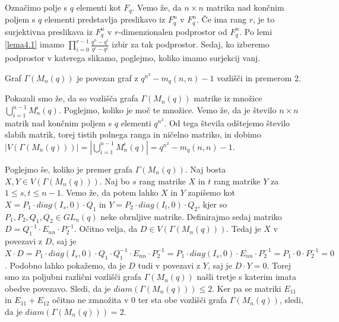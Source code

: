 \documentclass[mat1, tisk]{fmfdelo}
\begin{document}
\begin{dokaz}
  Označimo polje s $q$ elementi kot $F_q$.
  Vemo že, da $n \times n$ matrika nad končnim poljem s $q$ elementi predstavlja 
  preslikavo iz $F_q^n$ v $F_q^n$. Če ima rang $r$, je to surjektivna preslikava iz $F_q^n$ v 
  $r$-dimenzionalen podprostor od $F_q^n$. Po lemi \ref{lema4.1} imamo 
  $\prod\limits_{i=0}^{r-1} \frac{q^n - q^i}{q^r - q^i}$ izbir za tak podprostor. Sedaj, ko 
  izberemo podprostor v katerega slikamo, poglejmo, koliko imamo surjekcij vanj.
\end{dokaz}
%
\begin{lema}\label{lema4.3}
  Graf $\Gamma(M_n(q))$ je povezan graf z $q^{n^2} - m_q(n,n) - 1$ vozlišči in premerom $2$.
\end{lema}
\begin{dokaz}
  Pokazali smo že, da so vozlišča grafa $\Gamma(M_n(q))$ matrike iz množice $\bigcup\limits_{i=1}^{n-1} M_n^i(q)$. 
  Poglejmo, koliko je moč te množice. Vemo že, da je število $n \times n$ matrik nad končnim poljem s $q$ elementi 
  $q^{n^2}$. Od tega števila odštejemo število slabih matrik, torej tistih polnega ranga in ničelno matriko, 
  in dobimo $|V(\Gamma(M_n(q)))| = |\bigcup\limits_{i=1}^{n-1} M_n^i(q)| = q^{n^2} - m_q(n,n) - 1$.

  Poglejmo še, koliko je premer grafa $\Gamma(M_n(q))$. Naj bosta $X, Y \in V(\Gamma(M_n(q)))$. 
  Naj bo $s$ rang matrike $X$ in $t$ rang matrike $Y$ za $1 \leq s, t \leq n-1$. Vemo že, 
  da potem lahko $X$ in $Y$ zapišemo kot $X = P_1 \cdot diag(I_s, 0) \cdot Q_1$ in 
  $Y = P_2 \cdot diag(I_t, 0) \cdot Q_2$, kjer so $P_1, P_2, Q_1, Q_2 \in GL_n(q)$ 
  neke obrnljive matrike. Definirajmo sedaj matriko $D = Q^{-1}_1 \cdot E_{nn} \cdot P^{-1}_2$. 
  Očitno velja, da $D \in V(\Gamma(M_n(q)))$. Tedaj je $X$ v povezavi z $D$, saj je 
  $X \cdot D = P_1 \cdot diag(I_s, 0) \cdot Q_1 \cdot Q^{-1}_1 \cdot E_{nn} \cdot P^{-1}_2 = P_1 \cdot diag(I_s, 0) \cdot E_{nn} \cdot P^{-1}_2 = P_1 \cdot 0 \cdot P^{-1}_2 = 0$. 
  Podobno lahko pokažemo, da je $D$ tudi v povezavi z $Y$, saj je $D \cdot Y = 0$. Torej smo za poljubni različni 
  vozlišči grafa $\Gamma(M_n(q))$ našli tretje s katerim imata obedve povezavo. Sledi, da je 
  $diam(\Gamma(M_n(q))) \leq 2$. Ker pa se matriki $E_{11}$ in $E_{11} + E_{12}$ očitno ne zmnožita 
  v $0$ ter sta obe vozlišči grafa $\Gamma(M_n(q))$, sledi, da je $diam(\Gamma(M_n(q))) = 2$.
\end{dokaz}
%
\end{document}
